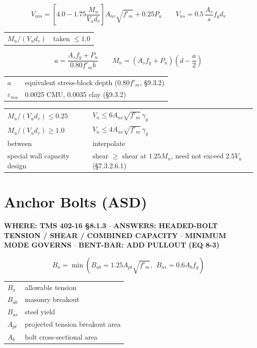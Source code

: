 \documentclass[10pt]{article}
\begin{document}
\begin{equation}
V_{nm} = \left[4.0 - 1.75\frac{M_u}{V_u d_v}\right]A_{nv}\sqrt{f'_m} + 0.25P_u
\qquad
V_{ns} = 0.5\,\frac{A_v}{s}f_y d_v
\end{equation}
{\ttfamily\footnotesize \begin{tabular}{@{}ll@{}}
$M_u/(V_u d_v)$ & taken $\le 1.0$\\
\end{tabular}}

\begin{equation}
a = \frac{A_s f_y + P_u}{0.80 f'_m b} \qquad M_n = \left(A_s f_y + P_u\right)\left(d - \frac{a}{2}\right)
\end{equation}
{\ttfamily\footnotesize \begin{tabular}{@{}ll@{}}
$a$ & equivalent stress-block depth ($0.80 f'_m$, \S 9.3.2)\\
$\varepsilon_{mu}$ & 0.0025 CMU, 0.0035 clay (\S 9.3.2)\\
\end{tabular}}


{\ttfamily\footnotesize \begin{tabular}{@{}ll@{}}
$M_u/(V_u d_v) \le 0.25$ & $V_n \le 6 A_{nv}\sqrt{f'_m}\,\gamma_g$\\
$M_u/(V_u d_v) \ge 1.0$ & $V_n \le 4 A_{nv}\sqrt{f'_m}\,\gamma_g$\\
between & interpolate\\
special wall capacity design & shear $\ge$ shear at $1.25 M_n$, need not exceed $2.5 V_u$ (\S 7.3.2.6.1)\\
\end{tabular}}

\section{Anchor Bolts (ASD)}

{\ttfamily\footnotesize\bfseries WHERE: TMS 402-16 \S 8.1.3 $\cdot$ ANSWERS: HEADED-BOLT TENSION / SHEAR / COMBINED CAPACITY $\cdot$ MINIMUM MODE GOVERNS $\cdot$ BENT-BAR: ADD PULLOUT (EQ 8-3)}

\begin{equation}
B_a = \min\left( B_{ab} = 1.25 A_{pt}\sqrt{f'_m},\ \ B_{as} = 0.6 A_b f_y \right)
\end{equation}
{\ttfamily\footnotesize \begin{tabular}{@{}ll@{}}
$B_a$ & allowable tension\\
$B_{ab}$ & masonry breakout\\
$B_{as}$ & steel yield\\
$A_{pt}$ & projected tension breakout area\\
$A_b$ & bolt cross-sectional area\\
\end{tabular}}
\end{document}

